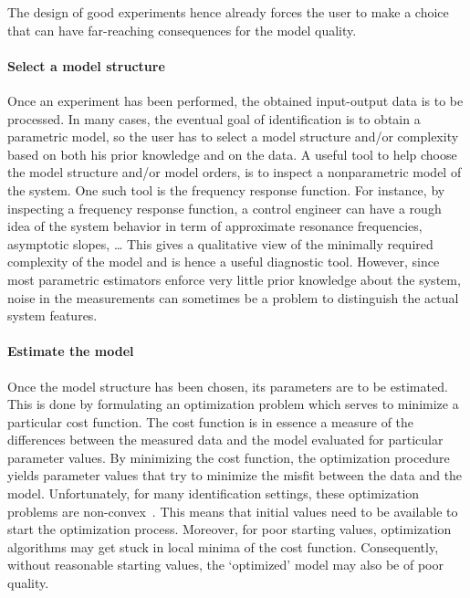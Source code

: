 The design of good experiments hence already forces the user to make a choice that can have far-reaching consequences for the model quality.

\paragraph{Select a model structure}
Once an experiment has been performed, the obtained input-output data is to be processed.
In many cases, the eventual goal of identification is to obtain a parametric model, so the user has to select a model structure and/or complexity based on both his prior knowledge and on the data.
A useful tool to help choose the model structure and/or model orders, is to inspect a nonparametric model of the system.
One such tool is the frequency response function.
For instance, by inspecting a frequency response function, a control engineer can have a rough idea of the system behavior in term of  approximate resonance frequencies, asymptotic slopes, \ldots
This gives a qualitative view of the minimally required complexity of the model and is hence a useful diagnostic tool.
However, since most parametric estimators enforce very little prior knowledge about the system, noise in the measurements can sometimes be a problem to distinguish the actual system features.

\paragraph{Estimate the model}
Once the model structure has been chosen, its parameters are to be estimated.
This is done by formulating an optimization problem which serves to minimize a particular cost function.
The cost function is in essence a measure of the differences between the measured data and the model evaluated for particular parameter values.
By minimizing the cost function, the optimization procedure yields parameter values that try to minimize the misfit between the data and the model.
Unfortunately, for many identification settings, these optimization problems are non-convex~\citep{Boyd2004}.
This means that initial values need to be available to start the optimization process.
Moreover, for poor starting values, optimization algorithms may get stuck in local minima of the cost function.
Consequently, without reasonable starting values, the `optimized' model may also be of poor quality. 

